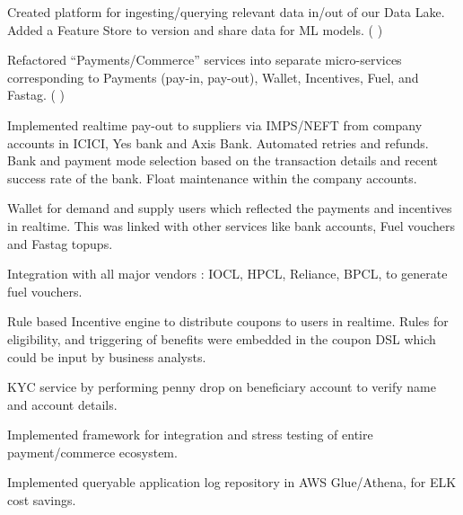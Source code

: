 \documentclass[]{deedy-resume-openfont}
\begin{document}
\hfill {}
\begin{tightemize}
	\item Created platform for ingesting/querying relevant data in/out of our Data Lake. Added a Feature Store to version and share data for ML models.\newline
    (
        {}
    )
	\item Refactored “Payments/Commerce” services into separate micro-services corresponding to Payments (pay-in, pay-out), Wallet, Incentives, Fuel, and Fastag.\newline
    (
        {}
    )
	\item Implemented realtime pay-out to suppliers via IMPS/NEFT from company accounts in ICICI, Yes bank and Axis Bank. Automated retries and refunds. Bank and payment mode selection based on the transaction details and recent success rate of the bank. Float maintenance within the company accounts.
	\item Wallet for demand and supply users which reflected the payments and incentives in realtime. This was linked with other services like bank accounts, Fuel vouchers and Fastag topups.
	\item Integration with all major vendors : IOCL, HPCL, Reliance, BPCL, to generate fuel vouchers.
	\item Rule based Incentive engine to distribute coupons to users in realtime. Rules for eligibility, and triggering of benefits were embedded in the coupon DSL which could be input by business analysts.
	\item KYC service by performing penny drop on beneficiary account to verify name and account details.
	\item Implemented framework for integration and stress testing of entire payment/commerce ecosystem.
	\item Implemented queryable application log repository in AWS Glue/Athena, for ELK cost savings.
\end{tightemize}
\sectionsep
\end{document}
